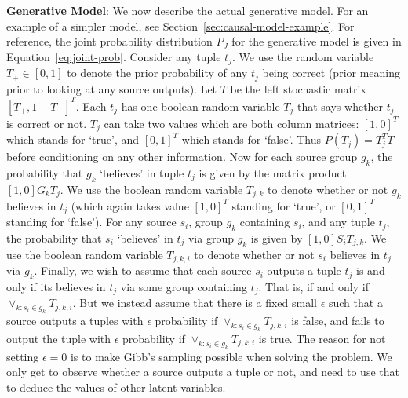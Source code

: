 \documentclass{sig-alternate}
\newcounter{prob}
\newcommand{\stitle}[1]{\vspace{0.5em}\noindent\textbf{#1}}
\begin{document}
\stitle{Generative Model}: We now describe the actual generative model. For an example of a simpler model, see Section~\ref{sec:causal-model-example}. For reference, the joint probability distribution $P_J$ for the generative model is given in Equation~\ref{eq:joint-prob}. Consider any tuple $t_j$. We use the random variable $T_{+} \in [0,1]$ to denote the prior probability of any $t_j$ being correct (prior meaning prior to looking at any source outputs). Let $T$ be the left stochastic matrix $[T_{+},1-T_{+}]^T$. Each $t_j$ has one boolean random variable $T_j$ that says whether $t_j$ is correct or not. $T_j$ can take two values which are both column matrices: $[1,0]^T$ which stands for `true', and $[0,1]^T$ which stands for `false'. Thus $P(T_j) = T_{j}^{T}T$ before conditioning on any other information. Now for each source group $g_k$, the probability that $g_k$ `believes' in tuple $t_j$ is given by the matrix product $[1,0]G_kT_j$. We use the boolean random variable $T_{j,k}$ to denote whether or not $g_k$ believes in $t_j$ (which again takes value $[1,0]^T$ standing for `true', or $[0,1]^T$ standing for `false'). For any source $s_i$, group $g_k$ containing $s_i$, and any tuple $t_j$, the probability that $s_i$ `believes' in $t_j$ via group $g_k$ is given by $[1,0]S_iT_{j,k}$. We use the boolean random variable $T_{j,k,i}$ to denote whether or not $s_i$ believes in $t_j$ via $g_k$. Finally, we wish to assume that each source $s_i$ outputs a tuple $t_j$ is and only if its believes in $t_j$ via some group containing $t_j$. That is, if and only if $\lor_{k : s_i \in g_k} T_{j,k,i}$. But we instead assume that there is a fixed small $\epsilon$ such that a source outputs a tuples with $\epsilon$ probability if $\lor_{k : s_i \in g_k} T_{j,k,i}$ is false, and fails to output the tuple with $\epsilon$ probability if $\lor_{k : s_i \in g_k} T_{j,k,i}$ is true. The reason for not setting $\epsilon = 0$ is to make Gibb's sampling possible when solving the problem. We only get to observe whether a source outputs a tuple or not, and need to use that to deduce the values of other latent variables. 

\end{document}
